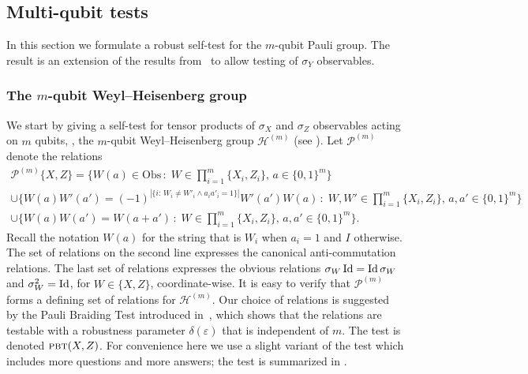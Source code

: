 \documentclass{toc}
\newcommand{\Id}{\ensuremath{\mathop{\rm Id}\nolimits}}
\newcommand{\setft}[1]{\mathrm{#1}}
\newcommand{\Obs}{\setft{Obs}}
\newcommand{\eps}{\varepsilon}
\newcommand{\pbt}{\textsc{pbt}}
\newcommand{\paulin}{\mathcal{P}^{(m)}\!}
\begin{document}
\subsection{Multi-qubit tests}
\label{sec:pauli-group}


In this section we formulate a robust self-test for the $m$-qubit Pauli group. The result is an extension of the results from~\cite{natarajan2016robust} to allow testing of $\sigma_Y$ observables. 

\subsubsection{The \texorpdfstring{$m$}{m}-qubit Weyl--Heisenberg group}
\label{sec:pbt}


We start by giving a self-test for tensor products of $\sigma_X$ and $\sigma_Z$ 
observables acting on $m$ qubits, \ie, the $m$-qubit Weyl--Heisenberg group $\mathcal{H}^{(m)}$ (see ). 
Let $\mathcal{P}^{(m)}$ denote the relations  
\begin{multline*}    %
%
\paulin\{X,Z\} = \Big\{ W(a)\in\Obs\,: \;W \in \prod_{i=1}^m \{X_i,Z_i\},\,a\in\{0,1\}^m\Big\}\\
\cup \Big\{W(a)W'(a')=(-1)^{|\{i:\,W_i\neq W'_i \wedge a_ia'_i=1\}|} W'(a')W(a)\,:\;W,W' \in \prod_{i=1}^m \{X_i,Z_i\},\, a,a'\in\{0,1\}^m\Big\}\\
 \cup\Big\{ W(a)W(a')=W(a+a')\,:\;W \in \prod_{i=1}^m \{X_i,Z_i\},\, a,a'\in\{0,1\}^m\Big\}.
\end{multline*}
Recall the notation $W(a)$ for the string that is $W_i$ when $a_i=1$ and $I$ otherwise. 
The set of relations on the second line expresses the canonical anti-commutation relations. The last set of relations expresses the obvious relations $\sigma_W \Id = \Id \sigma_W$ and $\sigma_W^2 = \Id$, for $W\in\{X,Z\}$, coordinate-wise. It is easy to verify that $\mathcal{P}^{(m)}$ forms a defining set of relations for $\mathcal{H}^{(m)}$. Our choice of relations is suggested by the Pauli Braiding Test introduced in~\cite{natarajan2016robust}, which shows that the relations are testable with a robustness parameter $\delta(\eps)$ that is independent of $m$. 
The test is denoted $\pbt(X,Z)$. For convenience here we use a slight variant of the test which includes more questions and more answers; the test is summarized in . 
\end{document}
